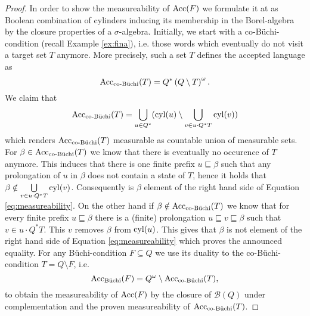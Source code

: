 \begin{proof}
  In order to show the measureability of $\operatorname{Acc}(F)$ we formulate it at as
  Boolean combination of cylinders inducing its membership in the
  Borel-algebra by the closure properties of a $\sigma$-algebra.
  Initially, we start with a co-Büchi-condition (recall Example \ref{ex:fina}),
  i.e. those words which eventually do not visit a target set $T$ anymore. More 
  precisely, such a set $T$ defines the accepted language as
  \begin{equation*}
    \operatorname{Acc}_{\operatorname{co-B\ddot{u}chi}}(T) = Q^{*}\left(Q\setminus T\right)^{\omega}.
  \end{equation*}
  We claim that
  \begin{equation}
    \operatorname{Acc}_{\operatorname{co-B\ddot{u}chi}}(T) = \bigcup\limits_{u\in Q^{*}}(
    \operatorname{cyl}(u)\setminus\bigcup\limits_{v\in u\cdot Q^{*}T}\operatorname{cyl}(v))
    \label{eq:measureability}
  \end{equation}
  which renders $\operatorname{Acc}_{\operatorname{co-B\ddot{u}chi}}(T)$ measurable as countable union of 
  measurable sets. For $\beta\in\operatorname{Acc}_{\operatorname{co-B\ddot{u}chi}}(T)$ we know that there is 
  eventually no occurence of $T$ anymore. This induces that there is one finite
  prefix $u\sqsubseteq\beta$ such that any prolongation of $u$ in $\beta$ does
  not contain a state of $T$, hence it holds that
  $\beta\notin\bigcup\limits_{v\in u\cdot Q^{*}T}\operatorname{cyl}(v)$. Consequently is
  $\beta$ element of the right hand side of Equation \ref{eq:measureability}.
  On the other hand if $\beta\notin\operatorname{Acc}_{\operatorname{co-B\ddot{u}chi}}(T)$ we know that for every
  finite prefix $u\sqsubseteq\beta$ there is a (finite) prolongation
  $u\sqsubseteq v\sqsubseteq\beta$ such that $v\in u\cdot Q^{*}T$. This $v$ 
  removes $\beta$ from $\operatorname{cyl}(u)$. This gives that $\beta$ is not element of the 
  right hand side of Equation \ref{eq:measureability} which proves the 
  announced equality. For any Büchi-condition $F\subseteq Q$ we use its duality 
  to the co-Büchi-condition $T = Q\setminus F$, i.e.
  \begin{equation*}
    \operatorname{Acc}_{\operatorname{B\ddot{u}chi}}(F) = Q^{\omega}\setminus\operatorname{Acc}_{\operatorname{co-B\ddot{u}chi}}(T),
  \end{equation*}
  to obtain the measureability of $\operatorname{Acc}(F)$ by the closure of $\mathcal{B}(Q)$
  under complementation and the proven measureability of $\operatorname{Acc}_{\operatorname{co-B\ddot{u}chi}}(T)$.
\end{proof}

